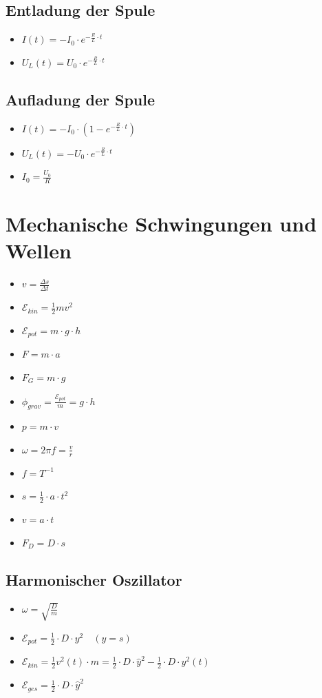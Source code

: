 \documentclass[paper = a4, twocolumn]{scrartcl}
\DeclareRobustCommand{\E}{\mathcal{E}}
\begin{document}
\subsection{Entladung der Spule}
\begin{itemize}
\item
	\( I(t) = -I_0 \cdot e^{-\frac{R}{L} \cdot t} \)
\item
	\( U_L(t) = U_0 \cdot e^{-\frac{R}{L} \cdot t} \)
\end{itemize}

\subsection{Aufladung der Spule}
\begin{itemize}
\item
	\( I(t) = -I_0 \cdot (1 - e^{-\frac{R}{L} \cdot t} ) \)
\item
	\( U_L(t) = -U_0 \cdot e^{-\frac{R}{L} \cdot t} \)
\item
	\( I_0 = \frac{U_0}{R} \)
\end{itemize}

\section{Mechanische Schwingungen und Wellen}
\begin{itemize}
\item
	\( v = \frac{\Delta s}{\Delta t} \)
\item
	\( \E_{kin} = \frac{1}{2} m v^2 \)
\item
	\( \E_{pot} = m \cdot g \cdot h \)
\item
	\( F = m \cdot a \)
\item
	\( F_G = m \cdot g \)
\item
	\( \phi_{grav} = \frac{\E_{pot}}{m} = g \cdot h \)
\item
	\( p = m \cdot v \)
\item
	\( \omega = 2 \pi f = \frac{v}{r} \)
\item
	\( f = T^{-1} \)
\item
	\( s = \frac{1}{2} \cdot a \cdot t^2 \)
\item
	\( v = a \cdot t \)
\item
	\( F_D = D \cdot s \)
\end{itemize}

\subsection{Harmonischer Oszillator}
\begin{itemize}
\item
	\( \omega = \sqrt{\frac{D}{m}} \)
\item
	\( \E_{pot} = \frac{1}{2} \cdot D \cdot y^2 \quad (y = s) \)
\item
	\( \E_{kin} = \frac{1}{2} v^2(t) \cdot m = \frac{1}{2} \cdot D \cdot
	\hat{y}^2 - \frac{1}{2} \cdot D \cdot y^2(t) \)
\item
	\( \E_{ges} = \frac{1}{2} \cdot D \cdot \hat{y}^2 \)
\end{itemize}
\end{document}
